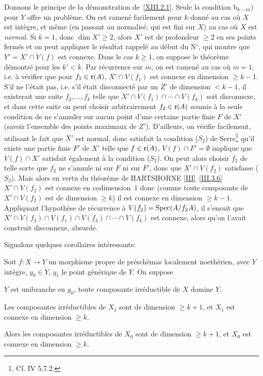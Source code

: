 Donnons le principe de la d\'emonstration de~\ref{XIII.2.1}. Seule la condition b$_{k-m}$) pour $Y$ offre un probl\`eme. On est ramen\'e facilement pour $k$ donn\'e au cas o\`u $X$ est int\`egre, et m\^eme (en passant au normalis\'e, qui est fini sur $X$) au cas o\`u $X$ est \emph{normal}. Si $k=1$, donc $\dim X' \ge 2$, alors $X'$ est de profondeur $\ge 2$ en ses points ferm\'es et on peut appliquer le r\'esultat rappel\'e au d\'ebut du N${}^\circ$, qui montre que \hbox{$Y'=X'\cap V(f)$} est connexe. Dans le cas $k\ge 1$, on suppose le th\'eor\`eme d\'emontr\'e pour les \hbox{$k'\!<\!k$}. Par r\'ecurrence sur $m$, on est ramen\'e au cas o\`u $m=1$, i.e. \`a v\'erifier que pour $f_1\in \mathfrak{r}(A)$, $X'\cap V(f_1)$ est connexe en dimension $\ge k-1$. S'il ne l'\'etait pas, i.e. s'il \'etait disconnect\'e par un $Z'$ de dimension $< k-1$, il existerait une suite $f_2, \dotsc, f_k$ telle que \hbox{$X'\cap V(f_1)\cap\dotsb\cap V(f_k)$} soit disconnexe, et dans cette suite on peut choisir arbitrairement $f_2\in \mathfrak{r}(A)$ soumis \`a la seule condition de ne s'annuler sur aucun point d'une certaine partie finie $F$ de $X'$ (\ignorespaces savoir l'ensemble des points maximaux de $Z'$). D'ailleurs, on v\'erifie facilement, utilisant le fait que $X'$ est normal, donc satisfait la condition ({$S_2$}) de Serre\footnote{Cf. \EGA IV 5.7.2.} qu'il existe une partie finie $F'$ de $X'$ telle que $f\in \mathfrak{r}(A)$, $V(f)\cap F'=\emptyset$ implique que $V(f)\cap X'$ satisfait \'egalement \`a la condition ({$S_2$}). On peut alors choisir $f_2$ de telle sorte que $f_2$ ne s'annule ni sur $F$ ni sur $F'$, donc que $X'\cap V(f_2)$ satisfasse ({$S_2$}). Mais alors en vertu du th\'eor\`eme de HARTSHORNE \ref{III}~\ref{III.3.6} $X'\cap V(f_2)$ est connexe en codimension~$1$ donc (comme toute composante de $X'\cap V(f_2)$ est de dimension $\ge k$) il est connexe en dimension $\ge k-1$. Appliquant l'hypoth\`ese de r\'ecurrence \`a $V(f_2)=\operatorname{Spec}(A/f_2A)$, il s'ensuit que $X'\cap V(f_2)\cap V(f_1)\cap V(f_3)\cap \dotsb\cap V(f_k)$ est connexe, alors qu'on l'avait construit disconnexe, absurde.

Signalons quelques corollaires int\'eressants:

\begin{corollaire} \label{XIII.2.2}
Soit $f\colon X\to Y$ un morphisme propre de pr\'esch\'emas localement noeth\'erien, avec $Y$ int\`egre, $y_0\in Y$, $y_1$ le point g\'en\'erique de $Y$. On suppose
\begin{enumeratea}
\item
$Y$ est unibranche en $y_0$, toute composante irr\'eductible de $X$ domine $Y$.
\item
Les composantes irr\'eductibles de $X_1$ sont de dimension $\ge k+1$, et $X_1$ est connexe en dimension $\ge k$.
\end{enumeratea}

Alors les composantes irr\'eductibles de $X_0$ sont de dimension $\ge k+1$, et $X_0$ est connexe en dimension $\ge k$.
\end{corollaire}


